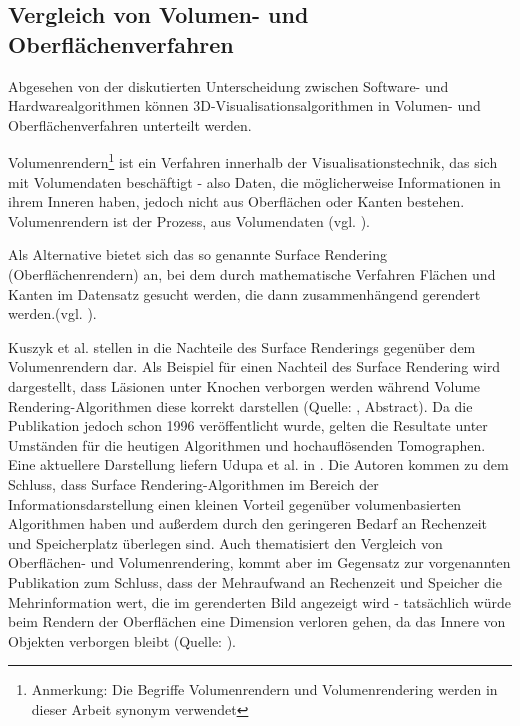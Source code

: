 \documentclass[pdftex,a4paper,titlepage,12pt]{scrartcl}
\newtheorem[L]{boxedDefinition}{Definition}
\begin{document}
\subsection{Vergleich von Volumen- und Oberflächenverfahren}\label{ssec:volsurfacealgorithms}
Abgesehen von der diskutierten Unterscheidung zwischen Software- und Hardwarealgorithmen können 3D-Visualisationsalgorithmen in Volumen- und Oberflächenverfahren unterteilt werden.

Volumenrendern\footnote{Anmerkung: Die Begriffe Volumenrendern und Volumenrendering werden in dieser Arbeit synonym verwendet} ist ein Verfahren innerhalb der Visualisationstechnik, das sich mit Volumendaten beschäftigt - also Daten, die möglicherweise Informationen in ihrem Inneren haben, jedoch nicht aus Oberflächen oder Kanten bestehen. Volumenrendern ist der Prozess, aus Volumendaten (vgl. \cite[Kapitel 1, Seite 2]{Bruckner2004}).

Als Alternative bietet sich das so genannte Surface Rendering (\glqq Oberflächenrendern\grqq) an, bei dem durch mathematische Verfahren Flächen und Kanten im Datensatz gesucht werden, die dann zusammenhängend gerendert werden.(vgl. \cite[Kapitel 1, Seite 2f.]{Bruckner2004}).

Kuszyk et al. stellen in \cite{Kuszyk1996} die Nachteile des Surface Renderings gegenüber dem Volumenrendern dar. Als Beispiel für einen Nachteil des Surface Rendering wird dargestellt, dass Läsionen unter Knochen verborgen werden während Volume Rendering-Algorithmen diese korrekt darstellen (Quelle: \cite{Kuszyk1996}, Abstract). Da die Publikation jedoch schon 1996 veröffentlicht wurde, gelten die Resultate unter Umständen für die heutigen Algorithmen und hochauflösenden Tomographen. Eine aktuellere Darstellung liefern Udupa et al. in \cite{Udupa2009}. Die Autoren kommen zu dem Schluss, dass Surface Rendering-Algorithmen im Bereich der Informationsdarstellung einen kleinen Vorteil gegenüber volumenbasierten Algorithmen haben und außerdem durch den geringeren Bedarf an Rechenzeit und Speicherplatz überlegen sind. Auch \cite{Bruckner2004} thematisiert den Vergleich von Oberflächen- und Volumenrendering, kommt aber im Gegensatz zur vorgenannten Publikation zum Schluss, dass der Mehraufwand an Rechenzeit und Speicher die Mehrinformation wert, die im gerenderten Bild angezeigt wird - tatsächlich würde beim Rendern der Oberflächen eine Dimension verloren gehen, da das Innere von Objekten verborgen bleibt (Quelle: \cite[Seite 2f.]{Bruckner2004}).
\end{document}
